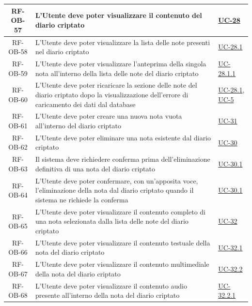 \documentclass[a4paper,12pt]{article}
\begin{document}
\begin{center}
\begin{longtable}{|c|p{8.5cm}|>{\centering\arraybackslash}p{4cm}|}
RF-OB-57 & L'Utente deve poter visualizzare il contenuto del diario criptato & \hyperref[subsec:UC-28]{UC-28} \\
\hline
\rowcolor{gray!20}
RF-OB-58 & L'Utente deve poter visualizzare la lista delle note presenti nel diario criptato & \hyperref[subsec:UC-28.1]{UC-28.1} \\
\hline
\rowcolor{white}
RF-OB-59 & L'Utente deve poter visualizzare l'anteprima della singola nota all'interno della lista delle note del diario criptato & \hyperref[subsec:UC-28.1.1]{UC-28.1.1} \\
\hline
\rowcolor{gray!20}
RF-OB-60 & L'Utente deve poter ricaricare la sezione delle note del diario criptato dopo la visualizzazione dell'errore di caricamento dei dati dal database & \hyperref[subsec:UC-28.1]{UC-28.1}, \hyperref[sec:UC-5]{UC-5} \\
\hline
\rowcolor{white}
RF-OB-61 & L'Utente deve poter creare una nuova nota vuota all'interno del diario criptato & \hyperref[subsec:UC-31]{UC-31} \\
\hline
\rowcolor{gray!20}
RF-OB-62 & L'Utente deve poter eliminare una nota esistente dal diario criptato & \hyperref[subsec:UC-30]{UC-30} \\
\hline
\rowcolor{white}
RF-OB-63 & Il sistema deve richiedere conferma prima dell'eliminazione definitiva di una nota del diario criptato & \hyperref[subsec:UC-30.1]{UC-30.1} \\
\hline
\rowcolor{gray!20}
RF-OB-64 & L'Utente deve poter confermare, con un'apposita voce, l'eliminazione della nota dal diario criptato quando il sistema ne richiede la conferma & \hyperref[subsec:UC-30.1]{UC-30.1} \\
\hline
\rowcolor{white}
RF-OB-65 & L'Utente deve poter visualizzare il contenuto completo di una nota selezionata dalla lista delle note del diario criptato & \hyperref[subsec:UC-32]{UC-32} \\
\hline
\rowcolor{gray!20}
RF-OB-66 & L'Utente deve poter visualizzare il contenuto testuale della nota del diario criptato & \hyperref[subsec:UC-32.1]{UC-32.1} \\
\hline
\rowcolor{white}
RF-OB-67 & L'Utente deve poter visualizzare il contenuto multimediale della nota del diario criptato & \hyperref[subsec:UC-32.2]{UC-32.2} \\
\hline
\rowcolor{gray!20}
RF-OB-68 & L'Utente deve poter visualizzare il contenuto audio presente all'interno della nota del diario criptato & \hyperref[subsec:UC-32.2.1]{UC-32.2.1} \\
\hline

\end{longtable}
\end{center}
\end{document}
